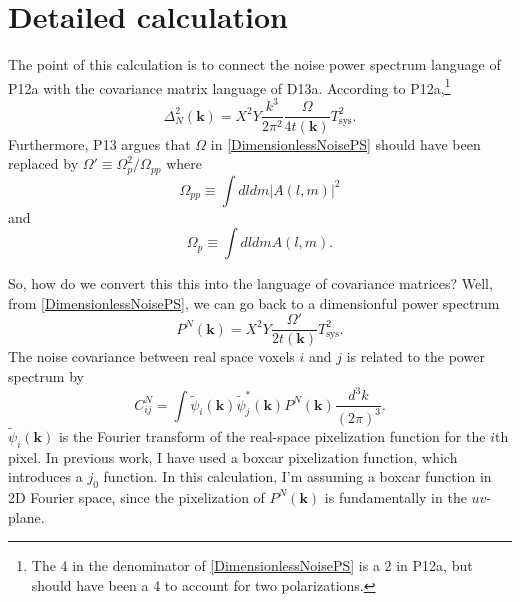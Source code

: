 \documentclass[]{article}
\newcommand{\beq}{\begin{equation}}
\newcommand{\eeq}{\end{equation}}
\newcommand{\Tsys}{T_\text{sys}}
\newcommand{\kv}{\mathbf{k}}
\begin{document}
\section{Detailed calculation}



The point of this calculation is to connect the noise power spectrum language of P12a with the covariance matrix language of D13a. According to P12a,\footnote{The 4 in the denominator of \eqref{DimensionlessNoisePS} is a 2 in P12a, but should have been a 4 to account for two polarizations.}
\beq
\Delta^2_N(\kv) = X^2 Y \frac{k^3}{2\pi^2}\frac{\Omega}{4t(\kv)}\Tsys^2 \label{DimensionlessNoisePS}.
\eeq
Furthermore, P13 argues that $\Omega$ in \eqref{DimensionlessNoisePS} should have been replaced by $\Omega' \equiv \Omega_p^2 / \Omega_{pp}$ where
\beq
\Omega_{pp} \equiv \int dl dm |A(l,m)|^2
\eeq
and 
\beq
\Omega_{p} \equiv \int dl dm A(l,m).
\eeq

So, how do we convert this this into the language of covariance matrices? Well, from \eqref{DimensionlessNoisePS}, we can go back to a dimensionful power spectrum
\beq
P^N(\kv) = X^2 Y \frac{\Omega'}{2t(\kv)}\Tsys^2.
\eeq  
The noise covariance between real space voxels $i$ and $j$ is related to the power spectrum by
\beq
C^N_{ij} = \int \widetilde{\psi}_i(\kv)\widetilde{\psi}^*_j(\kv) P^N(\kv)\frac{d^3k}{(2\pi)^3}.
\eeq
$\widetilde{\psi}_i(\kv)$ is the Fourier transform of the real-space pixelization function for the $i$th pixel.  In previous work, I have used a boxcar pixelization function, which introduces a $j_0$ function.  In this calculation, I'm assuming a boxcar function in 2D Fourier space, since the pixelization of $P^N(\kv)$ is fundamentally in the $uv$-plane.
\end{document}
